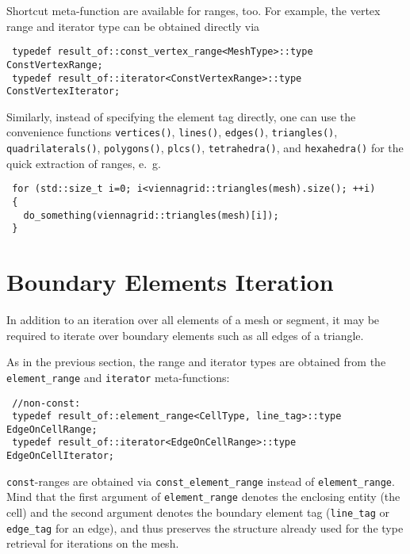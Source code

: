 
Shortcut meta-function are available for ranges, too.
For example, the vertex range and iterator type can be obtained directly via
\begin{lstlisting}
 typedef result_of::const_vertex_range<MeshType>::type ConstVertexRange;
 typedef result_of::iterator<ConstVertexRange>::type   ConstVertexIterator;
\end{lstlisting}
Similarly, instead of specifying the element tag directly, one can use the convenience functions
\lstinline|vertices()|, \lstinline|lines()|, \lstinline|edges()|, \lstinline|triangles()|, \lstinline|quadrilaterals()|, \lstinline|polygons()|, \lstinline|plcs()|, \lstinline|tetrahedra()|, and \lstinline|hexahedra()| for the quick extraction of ranges, e.~g.
\begin{lstlisting}
 for (std::size_t i=0; i<viennagrid::triangles(mesh).size(); ++i)
 {
   do_something(viennagrid::triangles(mesh)[i]);
 }
\end{lstlisting}

\section{Boundary Elements Iteration}
In addition to an iteration over all elements of a mesh or segment, it may be required to iterate over boundary elements such as all edges of a triangle.


As in the previous section, the range and iterator types are obtained from the \lstinline|element_range| and \lstinline|iterator| meta-functions:
\begin{lstlisting}
 //non-const:
 typedef result_of::element_range<CellType, line_tag>::type   EdgeOnCellRange;
 typedef result_of::iterator<EdgeOnCellRange>::type           EdgeOnCellIterator;
\end{lstlisting}
\lstinline|const|-ranges are obtained via \lstinline|const_element_range| instead of \lstinline|element_range|.
Mind that the first argument of \lstinline|element_range| denotes the enclosing entity (the cell) and the second argument denotes the boundary element tag (\lstinline|line_tag| or \lstinline|edge_tag| for an edge), and thus preserves the structure already used for the type retrieval for iterations on the mesh.


